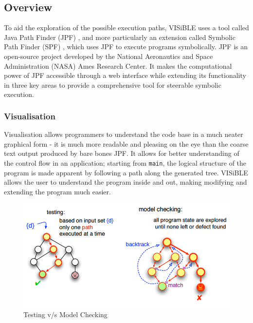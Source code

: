 \documentclass[titlepage,11pt]{article}
\begin{document}
\subsection{Overview}
To aid the exploration of the possible execution paths, VISiBLE uses a tool called Java Path Finder (JPF) \cite{petermehlitz}, and more particularly an extension called Symbolic Path Finder (SPF) \cite{corinapasareanu2016}, which uses JPF to execute programs symbolically. JPF is an open-source project developed by the National Aeronautics and Space Administration (NASA) Ames Research Center.
It makes the computational power of JPF accessible through a web interface while extending its functionality in three key areas to provide a comprehensive tool for steerable symbolic execution. 

\subsubsection{Visualisation}
Visualisation allows programmers to understand the code base in a much neater graphical form - it is much more readable and pleasing on the eye than the coarse text output produced by bare bones JPF.  It allows for better understanding of the control flow in an application; starting from \texttt{main}, the logical structure of the program is made apparent by following a path along the generated tree. VISiBLE allows the user to understand the program inside and out, making modifying and extending the program much easier. 

\begin{figure}
\centering
\includegraphics[scale=0.4]{model_checking.png}
\caption{Testing v/s Model Checking \cite{petermehlitz2010}} 
\label{fig:model_checking}
\end{figure}
\end{document}
